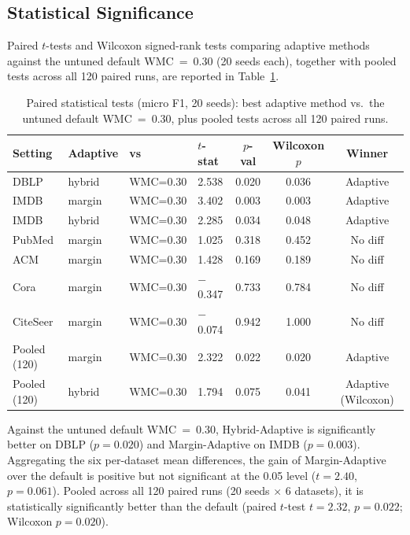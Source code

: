 \documentclass[a4paper,11pt,oneside,onecolumn,preprint]{elsarticle}
\numberwithin{equation}{section}
\begin{document}
\subsection{Statistical Significance}
\label{subsec:significance}


Paired $t$-tests and Wilcoxon signed-rank tests comparing adaptive methods against the untuned default WMC~=~0.30 (20 seeds each), together with pooled tests across all 120 paired runs, are reported in Table~\ref{tab:stats}.

\begin{table}[ht]
\centering
\caption{Paired statistical tests (micro F1, 20 seeds): best adaptive method vs.\ the untuned default WMC~=~0.30, plus pooled tests across all 120 paired runs.}
\label{tab:stats}
\begin{tabular}{llllccc}
\toprule
\textbf{Setting} & \textbf{Adaptive} & \textbf{vs} & \textbf{$t$-stat} & \textbf{$p$-val} & \textbf{Wilcoxon $p$} & \textbf{Winner} \\
\midrule
DBLP      & hybrid & WMC=0.30 & 2.538 & 0.020 & 0.036 & Adaptive \\
IMDB      & margin & WMC=0.30 & 3.402 & 0.003 & 0.003 & Adaptive \\
IMDB      & hybrid & WMC=0.30 & 2.285 & 0.034 & 0.048 & Adaptive \\
PubMed    & margin & WMC=0.30 & 1.025 & 0.318 & 0.452 & No diff \\
ACM       & margin & WMC=0.30 & 1.428 & 0.169 & 0.189 & No diff \\
Cora      & margin & WMC=0.30 & $-$0.347 & 0.733 & 0.784 & No diff \\
CiteSeer  & margin & WMC=0.30 & $-$0.074 & 0.942 & 1.000 & No diff \\
Pooled (120) & margin & WMC=0.30 & 2.322 & 0.022 & 0.020 & Adaptive \\
Pooled (120) & hybrid & WMC=0.30 & 1.794 & 0.075 & 0.041 & Adaptive (Wilcoxon) \\
\bottomrule
\end{tabular}
\end{table}

Against the untuned default WMC~=~0.30, Hybrid-Adaptive is significantly better on DBLP ($p = 0.020$) and Margin-Adaptive on IMDB ($p = 0.003$).
Aggregating the six per-dataset mean differences, the gain of Margin-Adaptive over the default is positive but not significant at the 0.05 level ($t = 2.40$, $p = 0.061$).
Pooled across all 120 paired runs (20 seeds $\times$ 6 datasets), it is statistically significantly better than the default (paired $t$-test $t = 2.32$, $p = 0.022$; Wilcoxon $p = 0.020$).
\end{document}
